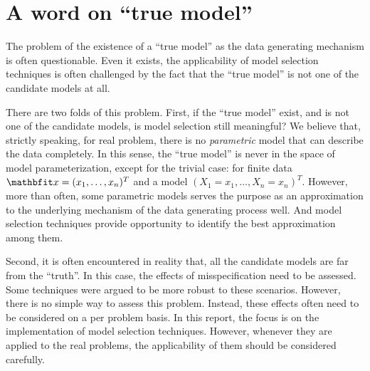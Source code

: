 \section{A word on ``true model''}
\label{sec:A word on true model}

The problem of the existence of a ``true model'' as the data generating
mechanism is often questionable. Even it exists, the applicability of model
selection techniques is often challenged by the fact that the ``true model''
is not one of the candidate models at all.

There are two folds of this problem. First, if the ``true model'' exist, and
is not one of the candidate models, is model selection still meaningful? We
believe that, strictly speaking, for real problem, there is no
\emph{parametric} model that can describe the data completely. In this sense,
the ``true model'' is never in the space of model parameterization, except for
the trivial case: for finite data $\bfx = (x_1,\dots,x_n)^T$ and a model $(X_1
= x_1,\dots,X_n = x_n)^T$. However, more than often, some parametric models
serves the purpose as an approximation to the underlying mechanism of the data
generating process well. And model selection techniques provide opportunity to
identify the best approximation among them.

Second, it is often encountered in reality that, all the candidate models are
far from the ``truth''. In this case, the effects of misspecification need to
be assessed. Some techniques were argued to be more robust to these scenarios.
However, there is no simple way to assess this problem. Instead, these effects
often need to be considered on a per problem basis. In this report, the focus
is on the implementation of model selection techniques. However, whenever they
are applied to the real problems, the applicability of them should be
considered carefully.
